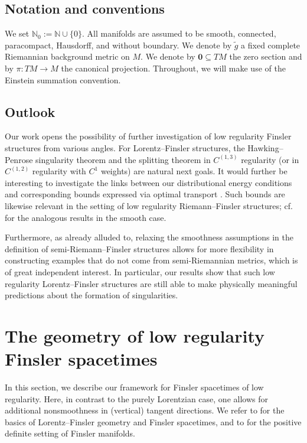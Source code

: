 \documentclass[a4paper,11pt]{article}
\numberwithin{equation}{section}
\theoremstyle{definition}
\theoremstyle{plain}
\newcommand{\N}{\mathbb N}
\begin{document}
\subsection{Notation and conventions}

We set $\N_0 :=\N \cup \{0\}$. 
All manifolds are assumed to be smooth, connected, paracompact, Hausdorff, and without boundary. 
We denote by $\tilde g$ a fixed complete Riemannian background metric on $M$. 
We denote by $\mathbf 0 \subseteq TM$ the zero section and by $\pi:TM \to M$ the canonical projection. 
Throughout, we will make use of the Einstein summation convention.
\subsection{Outlook}

Our work opens the possibility of further investigation of low regularity Finsler structures from various angles. 
For Lorentz--Finsler structures, the Hawking--Penrose singularity theorem \cite{KOSS} and the splitting theorem \cite{quintetnonsmooth} in $C^{(1,3)}$ regularity (or in $C^{(1,2)}$ regularity with $C^1$ weights) are natural next goals. 
It would further be interesting to investigate the links between our distributional energy conditions and corresponding bounds expressed via optimal transport \cite{BraunCalisti, braunsalamocandal}. 
Such bounds are likewise relevant in the setting of low regularity Riemann--Finsler structures; cf.\ \cite{OhtaMCP, OhtaCD} for the analogous results in the smooth case.

Furthermore, as already alluded to, relaxing the smoothness assumptions in the definition of semi-Riemann--Finsler structures allows for more flexibility in constructing examples that do not come from semi-Riemannian metrics, which is of great independent interest.
In particular, our results show that such low regularity Lorentz--Finsler structures are still able to make physically meaningful predictions about the formation of singularities.


\section{The geometry of low 
regularity Finsler spacetimes}%

In this section, we describe our framework for Finsler spacetimes of low regularity.
Here, in contrast to the purely Lorentzian case, one allows for additional nonsmoothness in (vertical) tangent directions.
We refer to \cite{MinguzziRaychaudhuri,LuMinguzziOhtaSingularity} for the basics of Lorentz--Finsler geometry and Finsler spacetimes, and to \cite{BCS,Shlec,Ohta2021} for the positive definite setting of Finsler manifolds.
\end{document}
